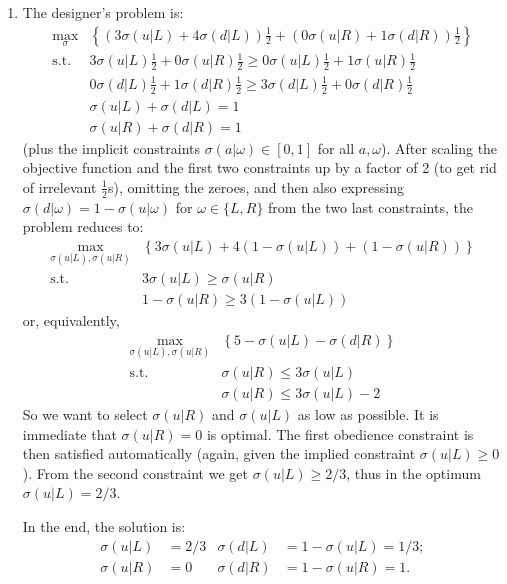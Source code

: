 \documentclass[a4paper]{article}
\begin{document}
\begin{enumerate}
		\item The designer's problem is:
		\begin{align*}
			\max_\sigma & \left\{ \left(3\sigma(u|L) + 4 \sigma(d|L)\right)\frac{1}{2} + \left(0\sigma(u|R) + 1 \sigma(d|R)\right)\frac{1}{2} \right\}
			\\
			\text{s.t. } 
			& 3 \sigma(u|L)\frac{1}{2} + 0 \sigma(u|R)\frac{1}{2} \geq 0 \sigma(u|L)\frac{1}{2} + 1 \sigma(u|R)\frac{1}{2}
			\\
			& 0 \sigma(d|L)\frac{1}{2} + 1 \sigma(d|R)\frac{1}{2} \geq 3 \sigma(d|L)\frac{1}{2} + 0 \sigma(d|R)\frac{1}{2}
			\\
			& \sigma(u|L) + \sigma(d|L) = 1
			\\
			& \sigma(u|R) + \sigma(d|R) = 1
		\end{align*}
		(plus the implicit constraints $\sigma(a|\omega)\in[0,1]$ for all $a,\omega$).
		After scaling the objective function and the first two constraints up by a factor of 2 (to get rid of irrelevant $\frac{1}{2}$s), omitting the zeroes, and then also expressing $\sigma(d|\omega) = 1-\sigma(u|\omega)$ for $\omega \in \{L,R\}$ from the two last constraints, the problem reduces to:
		\begin{align*}
			\max_{\sigma(u|L),\sigma(u|R)} & \left\{ 3\sigma(u|L) + 4 (1-\sigma(u|L)) + (1-\sigma(u|R)) \right\}
			\\
			\text{s.t. } 
			& 3 \sigma(u|L) \geq \sigma(u|R)
			\\
			& 1-\sigma(u|R)\geq 3 (1-\sigma(u|L))
		\end{align*}
		or, equivalently,
		\begin{align*}
			\max_{\sigma(u|L),\sigma(u|R)} & \left\{ 5 - \sigma(u|L) - \sigma(d|R) \right\}
			\\
			\text{s.t. } 
			& \sigma(u|R) \leq 3 \sigma(u|L)
			\\
			& \sigma(u|R)\leq 3\sigma(u|L)-2
		\end{align*}
		So we want to select $\sigma(u|R)$ and $\sigma(u|L)$ as low as possible. It is immediate that $\sigma(u|R)=0$ is optimal. The first obedience constraint is then satisfied automatically (again, given the implied constraint $\sigma(u|L) \geq 0$). From the second constraint we get $\sigma(u|L) \geq 2/3$, thus in the optimum $\sigma(u|L) = 2/3$.
		
		In the end, the solution is:
		\begin{align*}
			\sigma(u|L) &= 2/3	&	\sigma(d|L) &= 1-\sigma(u|L) = 1/3;
			\\
			\sigma(u|R) &= 0	&	\sigma(d|R) &= 1-\sigma(u|R) = 1.
		\end{align*}
	\end{enumerate}
	
\end{document}
